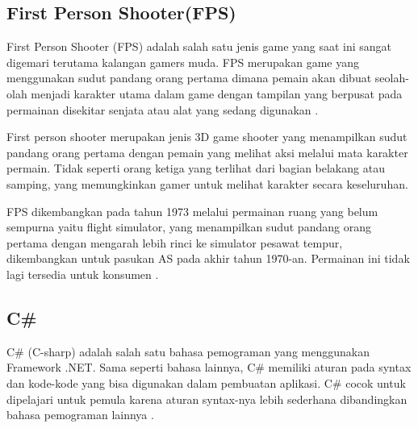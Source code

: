 \subsection{First Person Shooter(FPS)}
First Person Shooter (FPS) adalah salah satu jenis game yang saat ini sangat digemari terutama kalangan gamers muda. FPS merupakan game yang menggunakan sudut pandang orang pertama dimana pemain akan dibuat seolah-olah menjadi karakter utama dalam game dengan tampilan yang berpusat pada permainan disekitar senjata atau alat yang sedang digunakan \cite{fps}.

First person shooter merupakan jenis 3D game shooter yang menampilkan sudut pandang orang pertama dengan 
pemain yang melihat aksi melalui mata karakter permain. Tidak seperti orang ketiga yang terlihat dari bagian 
belakang atau samping, yang memungkinkan gamer untuk melihat karakter secara keseluruhan\cite{fps}.

FPS dikembangkan pada tahun 1973 melalui permainan ruang yang belum sempurna yaitu flight simulator, yang 
menampilkan sudut pandang orang pertama dengan mengarah lebih rinci ke simulator pesawat tempur, dikembangkan untuk pasukan AS pada akhir tahun 1970-an. Permainan ini tidak lagi tersedia untuk konsumen \cite{fps}.

\subsection{C\#}
C\# (C-sharp) adalah salah satu bahasa pemograman yang menggunakan Framework .NET. Sama seperti 
bahasa lainnya, C\# memiliki aturan pada syntax dan kode-kode yang bisa digunakan dalam pembuatan aplikasi. 
C\# cocok untuk dipelajari untuk pemula karena aturan syntax-nya lebih sederhana dibandingkan bahasa 
pemograman lainnya \cite{Ansori}.


